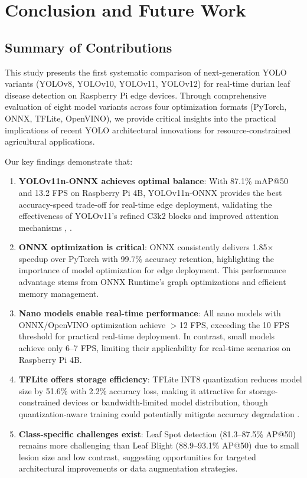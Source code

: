 \section{Conclusion and Future Work}

\subsection{Summary of Contributions}

This study presents the first systematic comparison of next-generation YOLO variants (YOLOv8, YOLOv10, YOLOv11, YOLOv12) for real-time durian leaf disease detection on Raspberry Pi edge devices. Through comprehensive evaluation of eight model variants across four optimization formats (PyTorch, ONNX, TFLite, OpenVINO), we provide critical insights into the practical implications of recent YOLO architectural innovations for resource-constrained agricultural applications.

Our key findings demonstrate that:

\begin{enumerate}
\item \textbf{YOLOv11n-ONNX achieves optimal balance}: With 87.1\% mAP@50 and 13.2 FPS on Raspberry Pi 4B, YOLOv11n-ONNX provides the best accuracy-speed trade-off for real-time edge deployment, validating the effectiveness of YOLOv11's refined C3k2 blocks and improved attention mechanisms \cite{4}, \cite{25}.

\item \textbf{ONNX optimization is critical}: ONNX consistently delivers 1.85$\times$ speedup over PyTorch with 99.7\% accuracy retention, highlighting the importance of model optimization for edge deployment. This performance advantage stems from ONNX Runtime's graph optimizations and efficient memory management.

\item \textbf{Nano models enable real-time performance}: All nano models with ONNX/OpenVINO optimization achieve $>$12 FPS, exceeding the 10 FPS threshold for practical real-time deployment. In contrast, small models achieve only 6--7 FPS, limiting their applicability for real-time scenarios on Raspberry Pi 4B.

\item \textbf{TFLite offers storage efficiency}: TFLite INT8 quantization reduces model size by 51.6\% with 2.2\% accuracy loss, making it attractive for storage-constrained devices or bandwidth-limited model distribution, though quantization-aware training could potentially mitigate accuracy degradation \cite{43}.

\item \textbf{Class-specific challenges exist}: Leaf Spot detection (81.3--87.5\% AP@50) remains more challenging than Leaf Blight (88.9--93.1\% AP@50) due to small lesion size and low contrast, suggesting opportunities for targeted architectural improvements or data augmentation strategies.
\end{enumerate}

